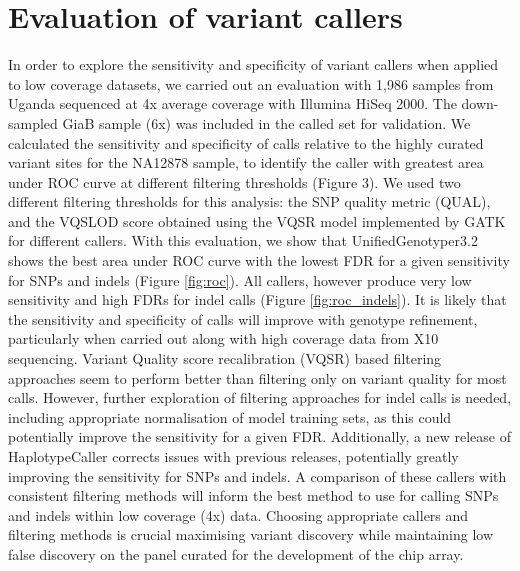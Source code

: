 \section{Evaluation of variant callers}

In order to explore the sensitivity and specificity of variant callers when applied to low coverage datasets, we carried out an evaluation with 1,986 samples from Uganda sequenced at 4x average coverage with Illumina HiSeq 2000. The down-sampled GiaB sample\cite{Zook2014} (6x) was included in the called set for validation. We calculated the sensitivity and specificity of calls relative to the highly curated variant sites for the NA12878 sample, to identify the caller with greatest area under ROC curve at different filtering thresholds (Figure 3). We used two different filtering thresholds for this analysis: the SNP quality metric (QUAL), and the VQSLOD score obtained using the VQSR model implemented by GATK for different callers. With this evaluation, we show that UnifiedGenotyper3.2 shows the best area under ROC curve with the lowest FDR for a given sensitivity for SNPs and indels (Figure \ref{fig:roc}). All callers, however produce very low sensitivity and high FDRs for indel calls (Figure \ref{fig:roc_indels}). It is likely that the sensitivity and specificity of calls will improve with genotype refinement, particularly when carried out along with high coverage data from X10 sequencing. Variant Quality score recalibration (VQSR) based filtering approaches seem to perform better than filtering only on variant quality for most calls. However, further exploration of filtering approaches for indel calls is needed, including appropriate normalisation of model training sets, as this could potentially improve the sensitivity for a given FDR. Additionally, a new release of HaplotypeCaller corrects issues with previous releases, potentially greatly improving the sensitivity for SNPs and indels. A comparison of these callers with consistent filtering methods will inform the best method to use for calling SNPs and indels within low coverage (4x) data. Choosing appropriate callers and filtering methods is crucial maximising variant discovery while maintaining low false discovery on the panel curated for the development of the chip array.

